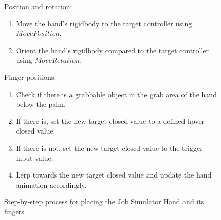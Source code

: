 \begin{figure}[H]
\centering
\footnotesize
\begin{flushleft}
Position and rotation:
\end{flushleft}
\begin{enumerate}[noitemsep]
\item Move the hand's rigidbody to the target controller using $MovePosition$.
\item Orient the hand's rigidbody compared to the target controller using $MoveRotation$.
\end{enumerate}
\begin{flushleft}
Finger positions:
\end{flushleft}
\begin{enumerate}[noitemsep]
\item Check if there is a grabbable object in the grab area of the hand below the palm.
\item If there is, set the new target closed value to a defined hover closed value.
\item If there is not, set the new target closed value to the trigger input value.
\item Lerp towards the new target closed value and update the hand animation accordingly.
\end{enumerate}
\caption{Step-by-step process for placing the Job Simulator Hand and its fingers.}
\label{fig:stepByStepJobSimHand}
\end{figure}

